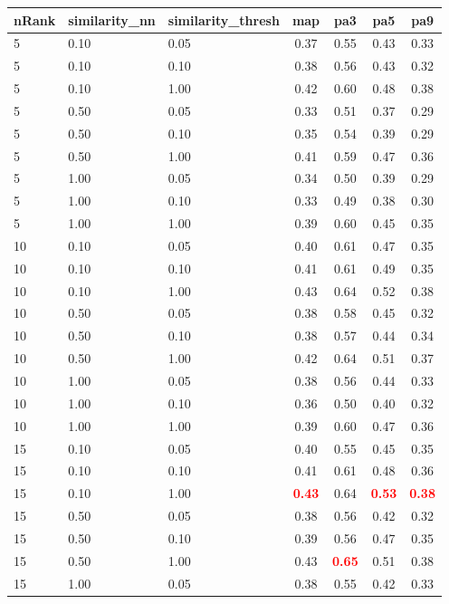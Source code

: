   
\begin{table} 
\begin{center} 
\scriptsize 
 \setlength{\tabcolsep}{.16667em} 
\begin{tabular}{lllcccc} 
nRank & similarity\_nn & similarity\_thresh & map & pa3 & pa5 & pa9 \\ 
\hline 
 5 & 0.10 & 0.05 & 0.37 & 0.55 & 0.43 & 0.33 \\ 
 5 & 0.10 & 0.10 & 0.38 & 0.56 & 0.43 & 0.32 \\ 
 5 & 0.10 & 1.00 & 0.42 & 0.60 & 0.48 & 0.38 \\ 
 5 & 0.50 & 0.05 & 0.33 & 0.51 & 0.37 & 0.29 \\ 
 5 & 0.50 & 0.10 & 0.35 & 0.54 & 0.39 & 0.29 \\ 
 5 & 0.50 & 1.00 & 0.41 & 0.59 & 0.47 & 0.36 \\ 
 5 & 1.00 & 0.05 & 0.34 & 0.50 & 0.39 & 0.29 \\ 
 5 & 1.00 & 0.10 & 0.33 & 0.49 & 0.38 & 0.30 \\ 
 5 & 1.00 & 1.00 & 0.39 & 0.60 & 0.45 & 0.35 \\ 
10 & 0.10 & 0.05 & 0.40 & 0.61 & 0.47 & 0.35 \\ 
10 & 0.10 & 0.10 & 0.41 & 0.61 & 0.49 & 0.35 \\ 
10 & 0.10 & 1.00 & 0.43 & 0.64 & 0.52 & 0.38 \\ 
10 & 0.50 & 0.05 & 0.38 & 0.58 & 0.45 & 0.32 \\ 
10 & 0.50 & 0.10 & 0.38 & 0.57 & 0.44 & 0.34 \\ 
10 & 0.50 & 1.00 & 0.42 & 0.64 & 0.51 & 0.37 \\ 
10 & 1.00 & 0.05 & 0.38 & 0.56 & 0.44 & 0.33 \\ 
10 & 1.00 & 0.10 & 0.36 & 0.50 & 0.40 & 0.32 \\ 
10 & 1.00 & 1.00 & 0.39 & 0.60 & 0.47 & 0.36 \\ 
15 & 0.10 & 0.05 & 0.40 & 0.55 & 0.45 & 0.35 \\ 
15 & 0.10 & 0.10 & 0.41 & 0.61 & 0.48 & 0.36 \\ 
15 & 0.10 & 1.00 & \textbf{\textcolor{red}{0.43}} & 0.64 & \textbf{\textcolor{red}{0.53}} & \textbf{\textcolor{red}{0.38}} \\ 
15 & 0.50 & 0.05 & 0.38 & 0.56 & 0.42 & 0.32 \\ 
15 & 0.50 & 0.10 & 0.39 & 0.56 & 0.47 & 0.35 \\ 
15 & 0.50 & 1.00 & 0.43 & \textbf{\textcolor{red}{0.65}} & 0.51 & 0.38 \\ 
15 & 1.00 & 0.05 & 0.38 & 0.55 & 0.42 & 0.33 \\ 

\end{tabular}
\end{center}
\end{table}
